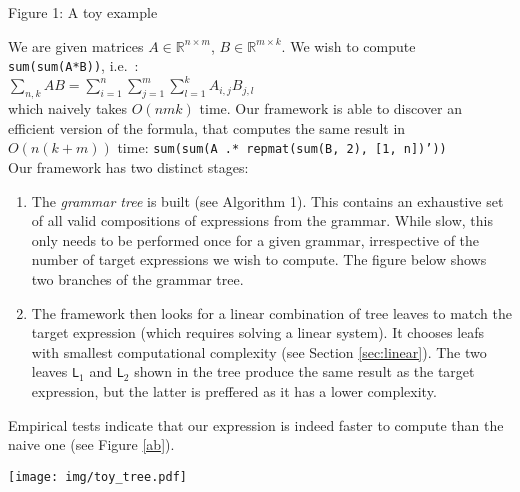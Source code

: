 \begin{minipage}{\linewidth}
\begin{framed}
\begin{flushleft}
Figure 1: A toy example
\vspace{3mm}

We are given matrices $A \in \mathbb{R}^{n \times m}$, $B \in \mathbb{R}^{m \times k}$. We wish
 to compute \texttt{sum(sum(A*B))}, i.e.~: 
\vspace{1.5mm} \\ 
$\sum_{n,k} AB = \sum_{i = 1}^n \sum_{j = 1}^m \sum_{l = 1}^k A_{i, j} B_{j, l} $
\vspace{1.5mm} \\ 
which naively takes $O(nmk)$ time. Our framework is able to discover
an efficient version of the formula, that computes the same result in $O(n(k+m))$
time: \texttt{sum(sum(A .* repmat(sum(B, 2), [1, n])'))}
 \vspace{1mm} \\ 
Our framework has two  distinct stages:
 \vspace{-2mm} 
 \begin{enumerate}
\item The {\em grammar tree} is built (see Algorithm 1). This contains
  an exhaustive set of all valid compositions of expressions from the
  grammar. While slow, this only needs to be performed once for a
  given grammar, irrespective of the number of target expressions we
  wish to compute. The figure below shows two branches of the grammar
  tree.
\item The framework then looks for a linear combination of tree leaves 
  to match the target expression (which requires solving a linear system).
  It chooses leafs with smallest computational complexity 
  (see Section \ref{sec:linear}). The two leaves \texttt{L$_1$} and
  \texttt{L$_2$} shown in the tree produce the same result as the target
  expression, but the latter is preffered as it has a lower complexity. 
\end{enumerate}

Empirical tests indicate that our expression is indeed faster to
compute than the naive one (see Figure \ref{ab}).

\texttt{[image: img/toy\_tree.pdf]}
\vspace{-5mm}
\end{flushleft}
\end{framed}
\label{fig:example_ab}

\end{minipage}


